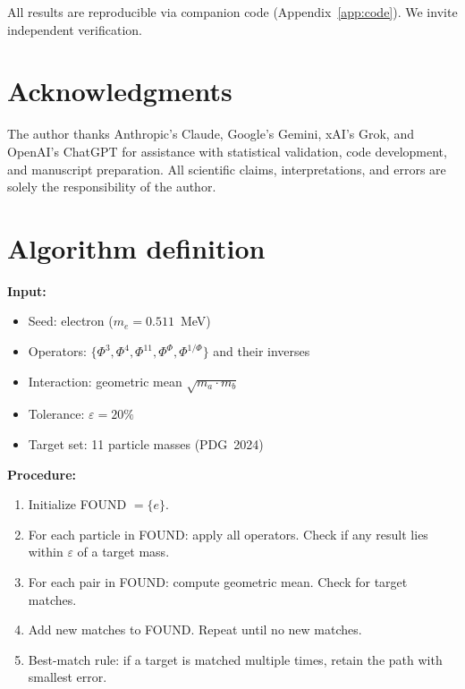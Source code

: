 \documentclass[11pt,a4paper]{article}
\begin{document}
All results are reproducible via companion code
(Appendix~\ref{app:code}). We invite independent verification.

\section*{Acknowledgments}

The author thanks Anthropic's Claude, Google's Gemini, xAI's Grok,
and OpenAI's ChatGPT for assistance with statistical validation, code
development, and manuscript preparation. All scientific claims,
interpretations, and errors are solely the responsibility of the author.

\appendix

\section{Algorithm definition}
\label{app:algorithm}

\textbf{Input:}
\begin{itemize}
  \item Seed: electron ($m_e = 0.511$~MeV)
  \item Operators: $\{\Phi^3, \Phi^4, \Phi^{11}, \Phi^\Phi,
    \Phi^{1/\Phi}\}$ and their inverses
  \item Interaction: geometric mean $\sqrt{m_a \cdot m_b}$
  \item Tolerance: $\varepsilon = 20\%$
  \item Target set: 11 particle masses (PDG~2024)
\end{itemize}

\textbf{Procedure:}
\begin{enumerate}
  \item Initialize FOUND $= \{e\}$.
  \item For each particle in FOUND: apply all operators. Check if any
        result lies within $\varepsilon$ of a target mass.
  \item For each pair in FOUND: compute geometric mean. Check for
        target matches.
  \item Add new matches to FOUND. Repeat until no new matches.
  \item Best-match rule: if a target is matched multiple times, retain
        the path with smallest error.
\end{enumerate}
\end{document}
